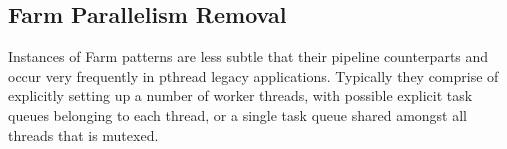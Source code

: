 %

\subsection{Farm Parallelism Removal} \label{sec:removefarm}

Instances of Farm patterns are less subtle that their pipeline counterparts and occur very frequently in pthread legacy applications. Typically they comprise of explicitly setting up a number of worker threads, with possible explicit task queues belonging to each thread, or a single task queue shared amongst all threads that is mutexed. 

